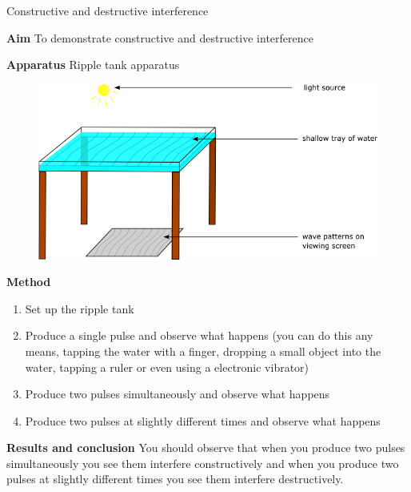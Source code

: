 	
\par
\label{m38802*eip-791}
\begin{g_experiment}{Constructive and destructive interference}

\textbf{Aim}
To demonstrate constructive and destructive interference
\par 
\label{m38802*eip7241}\noindent{}\textbf{Apparatus} 
Ripple tank apparatus
    \setcounter{subfigure}{0}
	\begin{figure}[H] %
    \begin{center}
    \label{m38802*id63458!!!underscore!!!media}\label{m38802*id63458!!!underscore!!!printimage}\includegraphics[width=0.8\columnwidth]{col11305.imgs/m38802_rippletray.png} %
      \vspace{2pt}
    \vspace{.1in}
    \end{center}
 \end{figure}       \par 
\label{m38802*eip7474}\noindent{}\textbf{Method}
\label{m38802*id6242}\begin{enumerate}[noitemsep, label=\textbf{\arabic*}. ] 
            \item Set up the ripple tank	
	    \item Produce a single pulse and observe what happens (you can do this any means, tapping the water with a finger, dropping a small object into the water, tapping a ruler or even using a electronic vibrator)
	  \item Produce two pulses simultaneously and observe what happens
	  \item Produce two pulses at slightly different times and observe what happens\end{enumerate}
\par 
\label{m38802*id614134}\noindent{}\textbf{Results and conclusion}
You should observe that when you produce two pulses simultaneously you see them interfere constructively and when you produce two pulses at slightly different times you see them interfere destructively.
\par \label{m38802*secfhsst!!!underscore!!!id636}
\end{g_experiment}


